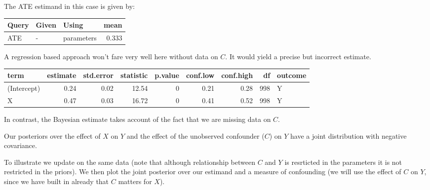 \documentclass[
  12pt,
]{book}
\newenvironment{Shaded}{\begin{snugshade}}{\end{snugshade}}
\newcommand{\DataTypeTok}[1]{\textcolor[rgb]{0.13,0.29,0.53}{#1}}
\newcommand{\DecValTok}[1]{\textcolor[rgb]{0.00,0.00,0.81}{#1}}
\newcommand{\KeywordTok}[1]{\textcolor[rgb]{0.13,0.29,0.53}{\textbf{#1}}}
\newcommand{\NormalTok}[1]{#1}
\newcommand{\OperatorTok}[1]{\textcolor[rgb]{0.81,0.36,0.00}{\textbf{#1}}}
\newcommand{\StringTok}[1]{\textcolor[rgb]{0.31,0.60,0.02}{#1}}
\begin{document}
The ATE estimand in this case is given by:

\begin{tabular}{l|l|l|r}
\hline
Query & Given & Using & mean\\
\hline
ATE & - & parameters & 0.333\\
\hline
\end{tabular}

A regression based approach won't fare very well here without data on \(C\). It would yield a precise but incorrect estimate.

\begin{Shaded}
\end{Shaded}

\begin{tabular}{l|r|r|r|r|r|r|r|l}
\hline
term & estimate & std.error & statistic & p.value & conf.low & conf.high & df & outcome\\
\hline
(Intercept) & 0.24 & 0.02 & 12.54 & 0 & 0.21 & 0.28 & 998 & Y\\
\hline
X & 0.47 & 0.03 & 16.72 & 0 & 0.41 & 0.52 & 998 & Y\\
\hline
\end{tabular}

In contrast, the Bayesian estimate takes account of the fact that we are missing data on \(C\).

Our posteriors over the effect of \(X\) on \(Y\) and the effect of the unobserved confounder (\(C\)) on \(Y\) have a joint distribution with negative covariance.

To illustrate we update on the same data (note that although relationship between \(C\) and \(Y\) is resrticted in the parameters it is not restricted in the priors). We then plot the joint posterior over our estimand and a measure of confounding (we will use the effect of \(C\) on \(Y\), since we have built in already that \(C\) matters for \(X\)).
\end{document}
